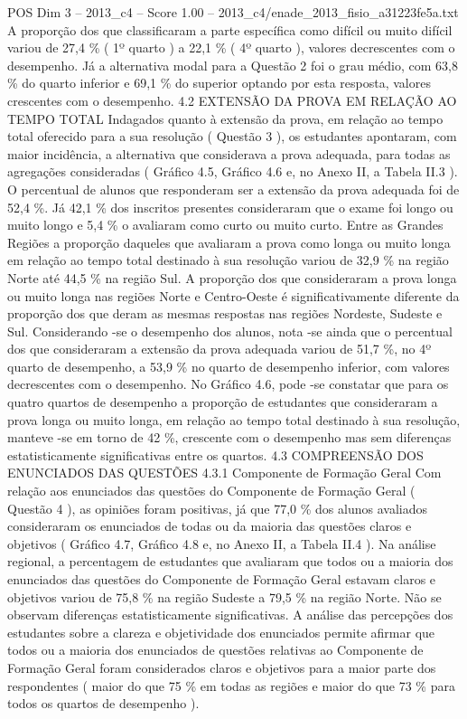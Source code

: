 \begin{textsample}{POS Dim 3 – 2013\_c4 – Score 1.00 – 2013\_c4/enade\_2013\_fisio\_a31223fe5a.txt}
A proporção dos que classificaram a parte específica como difícil ou muito difícil variou de 27,4 \% ( 1º quarto ) a 22,1 \% ( 4º quarto ), valores decrescentes com o desempenho.
Já a alternativa modal para a Questão 2 foi o grau médio, com 63,8 \% do quarto inferior e 69,1 \% do superior optando por esta resposta, valores crescentes com o desempenho. 4.2 EXTENSÃO DA PROVA EM RELAÇÃO AO TEMPO TOTAL Indagados quanto à extensão da prova, em relação ao tempo total oferecido para a sua resolução ( Questão 3 ), os estudantes apontaram, com maior incidência, a alternativa que considerava a prova adequada, para todas as agregações consideradas ( Gráfico 4.5, Gráfico 4.6 e, no Anexo II, a Tabela II.3 ).
O percentual de alunos que responderam ser a extensão da prova adequada foi de 52,4 \%.
Já 42,1 \% dos inscritos presentes consideraram que o exame foi longo ou muito longo e 5,4 \% o avaliaram como curto ou muito curto.
Entre as Grandes Regiões a proporção daqueles que avaliaram a prova como longa ou muito longa em relação ao tempo total destinado à sua resolução variou de 32,9 \% na região Norte até 44,5 \% na região Sul.
A proporção dos que consideraram a prova longa ou muito longa nas regiões Norte e Centro-Oeste é significativamente diferente da proporção dos que deram as mesmas respostas nas regiões Nordeste, Sudeste e Sul.
Considerando -se o desempenho dos alunos, nota -se ainda que o percentual dos que consideraram a extensão da prova adequada variou de 51,7 \%, no 4º quarto de desempenho, a 53,9 \% no quarto de desempenho inferior, com valores decrescentes com o desempenho.
No Gráfico 4.6, pode -se constatar que para os quatro quartos de desempenho a proporção de estudantes que consideraram a prova longa ou muito longa, em relação ao tempo total destinado à sua resolução, manteve -se em torno de 42 \%, crescente com o desempenho mas sem diferenças estatisticamente significativas entre os quartos. 4.3 COMPREENSÃO DOS ENUNCIADOS DAS QUESTÕES 4.3.1 Componente de Formação Geral Com relação aos enunciados das questões do Componente de Formação Geral ( Questão 4 ), as opiniões foram positivas, já que 77,0 \% dos alunos avaliados consideraram os enunciados de todas ou da maioria das questões claros e objetivos ( Gráfico 4.7, Gráfico 4.8 e, no Anexo II, a Tabela II.4 ).
Na análise regional, a percentagem de estudantes que avaliaram que todos ou a maioria dos enunciados das questões do Componente de Formação Geral estavam claros e objetivos variou de 75,8 \% na região Sudeste a 79,5 \% na região Norte.
Não se observam diferenças estatisticamente significativas.
A análise das percepções dos estudantes sobre a clareza e objetividade dos enunciados permite afirmar que todos ou a maioria dos enunciados de questões relativas ao Componente de Formação Geral foram considerados claros e objetivos para a maior parte dos respondentes ( maior do que 75 \% em todas as regiões e maior do que 73 \% para todos os quartos de desempenho ).

\end{textsample}
